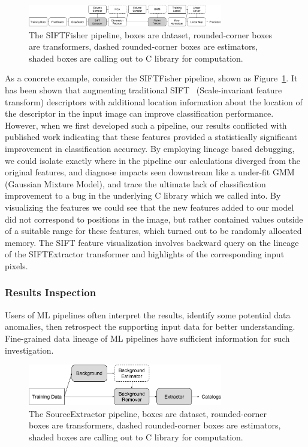 \documentclass{sig-alternate}
\begin{document}
\begin{figure}[ht]
\begin{center}
    \includegraphics[width=85mm]{pictures/VOCSIFTFisher}
    \caption {The SIFTFisher pipeline, boxes are dataset, rounded-corner boxes are transformers, dashed rounded-corner boxes are estimators, shaded boxes are calling out to C library for computation.
    \label{fig:vocsiftfisher}
}
\end{center}
\end{figure}

As a concrete example, consider the SIFTFisher pipeline, shown as Figure~\ref{fig:vocsiftfisher}. 
It has been shown that augmenting traditional SIFT~\cite{lowe99} (Scale-invariant feature transform) descriptors with additional location information about the location of the descriptor in the input image can improve classification performance.
However, when we first developed such a pipeline, our results conflicted with published work indicating that these features provided a statistically significant improvement in classification accuracy.
By employing lineage based debugging, we could isolate exactly where in the pipeline our calculations diverged from the original features, and diagnose impacts seen downstream like a under-fit GMM (Gaussian Mixture Model), and trace the ultimate lack of classification improvement to a bug in the underlying C library which we called into.
By visualizing the features we could see that the new features added to our model did not correspond to positions in the image, but rather contained values outside of a suitable range for these features, which turned out to be randomly allocated memory. The SIFT feature visualization involves backward query on the lineage of the SIFTExtractor transformer and highlights of the corresponding input pixels.


\subsubsection{Results Inspection}
Users of ML pipelines often interpret the results, identify some potential data anomalies, then retrospect the supporting input data for better understanding.
Fine-grained data lineage of ML pipelines have sufficient information for such investigation.

\begin{figure}[h]
\begin{center}
    \includegraphics[width=85mm]{pictures/SourceExtractor}
    \caption {The SourceExtractor pipeline, boxes are dataset, rounded-corner boxes are transformers, dashed rounded-corner boxes are estimators, shaded boxes are calling out to C library for computation.
    \label{fig:sourceextractor}
}
\end{center}
\end{figure}
\end{document}
